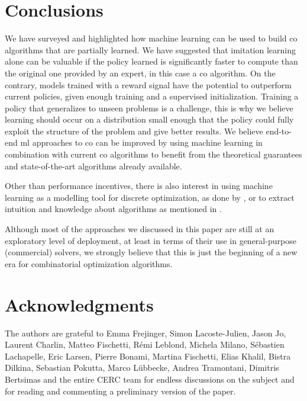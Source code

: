 \documentclass[11pt]{article}
\begin{document}
\section{Conclusions}
	\label{sec:conclusions}
	We have surveyed and highlighted how machine learning can be used to build \acrlong{co} algorithms
	that are partially learned.
	We have suggested that imitation learning alone can be valuable if the policy learned is
	significantly faster to compute than the original one provided by an expert, in this case a
	\acrlong{co} algorithm.
	On the contrary, models trained with a reward signal have the potential to outperform current
	policies, given enough training and a supervised initialization.
	Training a policy that generalizes to unseen problems is a challenge, this is why we believe
	learning should occur on a distribution small enough that the policy could fully exploit the
	structure of the problem and give better results.
	We believe end-to-end \acrlong{ml} approaches to \acrlong{co} can be improved by using
	machine learning in combination with current \acrlong{co} algorithms to benefit from the
	theoretical guarantees and state-of-the-art algorithms already available.

	Other than performance incentives, there is also interest in using machine learning as a modelling
	tool for discrete optimization, as done by \cite{LombardiBoostingCombinatorialProblem2018}, or to
	extract intuition and knowledge about algorithms as mentioned in
	\cite{BonamiLearningClassificationMixedInteger2018, KhalilLearningCombinatorialOptimization2017}.

	Although most of the approaches we discussed in this paper are still at an exploratory level of
	deployment, at least in terms of their use in general-purpose (commercial) solvers, we strongly
	believe that this is just the beginning of a new era for combinatorial optimization algorithms.

\section*{Acknowledgments}
	The authors are grateful to Emma Frejinger, Simon Lacoste-Julien, Jason Jo, Laurent Charlin, Matteo
	Fischetti, Rémi Leblond, Michela Milano, Sébastien Lachapelle, Eric Larsen, Pierre Bonami, Martina
	Fischetti, Elias Khalil, Bistra Dilkina, Sebastian Pokutta, Marco Lübbecke, Andrea Tramontani,
	Dimitris Bertsimas and the entire CERC team for endless discussions on the subject and for reading
	and commenting a preliminary version of the paper.


\end{document}
